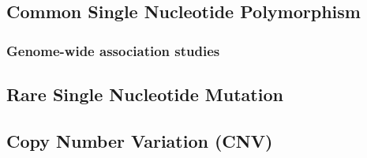 \subsection{Common Single Nucleotide Polymorphism}
\subsubsection{Genome-wide association studies}
\subsection{Rare Single Nucleotide Mutation}
\subsection{Copy Number Variation (CNV)}
